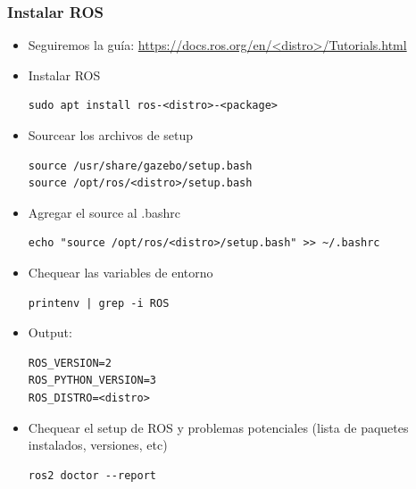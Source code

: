 \begin{frame}[fragile]
	\frametitle{Instalar ROS}
    \scriptsize
    \begin{itemize}
        \item Seguiremos la guía: \href{https://docs.ros.org/en/<distro>/Tutorials.html}{https://docs.ros.org/en/<distro>/Tutorials.html}
        \item Instalar ROS
        \begin{lstlisting}[style=bash]
sudo apt install ros-<distro>-<package>
        \end{lstlisting}

        \item Sourcear los archivos de setup
        \begin{lstlisting}[style=bash]source /usr/share/gazebo/setup.bash
source /opt/ros/<distro>/setup.bash
        \end{lstlisting}

        \item Agregar el source al .bashrc
        \begin{lstlisting}[style=bash]
echo "source /opt/ros/<distro>/setup.bash" >> ~/.bashrc
        \end{lstlisting}

        \item Chequear las variables de entorno
        \begin{lstlisting}[style=bash]
printenv | grep -i ROS
        \end{lstlisting}

        \item Output:
        \begin{lstlisting}[style=bash]
ROS_VERSION=2
ROS_PYTHON_VERSION=3
ROS_DISTRO=<distro>
        \end{lstlisting}	
        
        \item Chequear el setup de ROS y problemas potenciales (lista de paquetes instalados, versiones, etc)
        
        \begin{lstlisting}[style=bash]
ros2 doctor --report
        \end{lstlisting}
    \end{itemize}
\end{frame}

